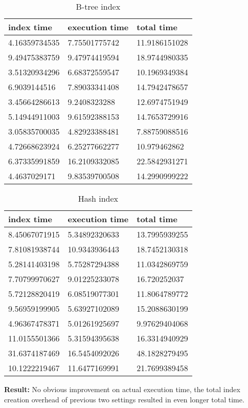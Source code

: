 \begin{itemize*}
\begin{table}[H]
\begin{center}
\begin{tabular}{|l|l|l|}
\hline
index time & execution time & total time                \\ \hline
4.16359734535 & 7.75501775742 & 11.9186151028 \\ \hline
9.49475383759 & 9.47974419594 & 18.9744980335 \\ \hline
3.51320934296 & 6.68372559547 & 10.1969349384 \\ \hline
6.9039144516 & 7.89033341408 & 14.7942478657 \\ \hline
3.45664286613 & 9.2408323288 & 12.6974751949 \\ \hline
5.14944911003 & 9.61592388153 & 14.7653729916 \\ \hline
3.05835700035 & 4.82923388481 & 7.88759088516 \\ \hline
4.72668623924 & 6.25277662277 & 10.979462862 \\ \hline
6.37335991859 & 16.2109332085 & 22.5842931271 \\ \hline
4.4637029171 & 9.83539700508 & 14.2990999222 \\ \hline
\end{tabular}
\end{center}
\caption{B-tree index}
\end{table}

\begin{table}[H]
\begin{center}
\begin{tabular}{|l|l|l|}
\hline
index time & execution time & total time     \\ \hline
8.45067071915 & 5.34892320633 & 13.7995939255 \\ \hline
7.81081938744 & 10.9343936443 & 18.7452130318 \\ \hline
5.28141403198 & 5.75287294388 & 11.0342869759 \\ \hline
7.70799970627 & 9.01225233078 & 16.720252037 \\ \hline
5.72128820419 & 6.08519077301 & 11.8064789772 \\ \hline
9.56959199905 & 5.63927102089 & 15.2088630199 \\ \hline
4.96367478371 & 5.01261925697 & 9.97629404068 \\ \hline
11.0155501366 & 5.31594395638 & 16.3314940929 \\ \hline
31.6374187469 & 16.5454092026 & 48.1828279495 \\ \hline
10.1222219467 & 11.6477169991 & 21.7699389458 \\ \hline
\end{tabular}
\end{center}
\caption{Hash index}
\end{table}

\par \textbf{Result:} No obvious improvement on actual execution time, the total index creation overhead of previous two settings resulted in even longer total time.
\end{itemize*}
